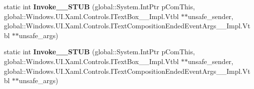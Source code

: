 \begin{DoxyCompactItemize}
static int {\bfseries Invoke\+\_\+\+\_\+\+S\+T\+UB} (global\+::\+System.\+Int\+Ptr p\+Com\+This, global\+::\+Windows.\+U\+I.\+Xaml.\+Controls.\+I\+Text\+Box\+\_\+\+\_\+\+Impl.\+Vtbl $\ast$$\ast$unsafe\+\_\+sender, global\+::\+Windows.\+U\+I.\+Xaml.\+Controls.\+I\+Text\+Composition\+Ended\+Event\+Args\+\_\+\+\_\+\+Impl.\+Vtbl $\ast$$\ast$unsafe\+\_\+args)
\item 
\mbox{\label{struct_windows_1_1_foundation_1_1_typed_event_handler___a___windows___u_i___xaml___controls___te0b4df93de6e851b0934d485b06536178_a92e6d4444b6b1cb2224285433b960bb9}} 
static int {\bfseries Invoke\+\_\+\+\_\+\+S\+T\+UB} (global\+::\+System.\+Int\+Ptr p\+Com\+This, global\+::\+Windows.\+U\+I.\+Xaml.\+Controls.\+I\+Text\+Box\+\_\+\+\_\+\+Impl.\+Vtbl $\ast$$\ast$unsafe\+\_\+sender, global\+::\+Windows.\+U\+I.\+Xaml.\+Controls.\+I\+Text\+Composition\+Ended\+Event\+Args\+\_\+\+\_\+\+Impl.\+Vtbl $\ast$$\ast$unsafe\+\_\+args)
\end{DoxyCompactItemize}
